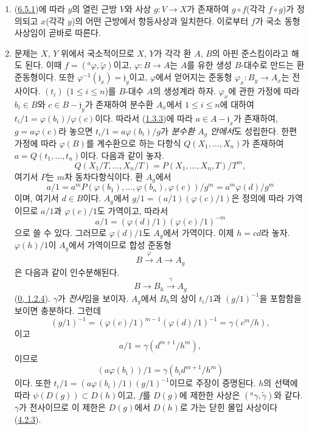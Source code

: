 \begin{enumerate}
  \item[\rm(ii)] (\hyperref[I.6.5.1-ko]{6.5.1})에 따라 $y$의 열린 근방
    $V$와 사상 $g:V\to X$가 존재하여 $g\circ f$(각각 $f\circ g$)가
    정의되고 $x$(각각 $y$)의 어떤 근방에서 항등사상과 일치한다. 이로부터
    $f$가 국소 동형사상임이 곧바로 따른다.
  \item[\rm(i)] 문제는 $X$, $Y$ 위에서 국소적이므로 $X$, $Y$가 각각 환
    $A$, $B$의 아핀 준스킴이라고 해도 된다. 이때
    $f=({}^a\varphi,\widetilde{\varphi})$이고, $\varphi:B\to A$는 $A$를
    유한 생성 $B$-대수로 만드는 환 준동형이다. 또한
    $\varphi^{-1}(\mathfrak{j}_x)=\mathfrak{j}_y$이고, $\varphi$에서
    얻어지는 준동형 $\varphi_x:B_y\to A_x$는 전사이다. $(t_i)$
    ($1\leq i\leq n$)를 $B$-대수 $A$의 생성계라 하자. $\varphi_x$에 관한
    가정에 따라 $b_i\in B$와 $c\in B-\mathfrak{j}_y$가 존재하여 분수환
    $A_x$에서 $1\leq i\leq n$에 대하여
    $t_i/1=\varphi(b_i)/\varphi(c)$이다. 따라서
    (\hyperref[I.1.3.3-ko]{1.3.3})에 따라 $a\in A-\mathfrak{j}_x$가
    존재하여, $g=a\varphi(c)$라 놓으면
    $t_i/1=a\varphi(b_i)/g$가 \emph{분수환 $A_g$ 안에서}도 성립한다.
    한편 가정에 따라 $\varphi(B)$를 계수환으로 하는 다항식
    $Q(X_1,\ldots,X_n)$가
    존재하여 $a=Q(t_1,\ldots,t_n)$이다. 다음과 같이 놓자.
    \[
      Q(X_1/T,\ldots,X_n/T)
      =P(X_1,\ldots,X_n,T)/T^m,
    \]
    여기서 $P$는 $m$차 동차다항식이다. 환 $A_g$에서
    \[
      a/1
      =a^mP(\varphi(b_1),\ldots,\varphi(b_n),\varphi(c))/g^m
      =a^m\varphi(d)/g^m
    \]
    이며, 여기서 $d\in B$이다. $A_g$에서
    $g/1=(a/1)(\varphi(c)/1)$은 정의에 따라 가역이므로 $a/1$과
    $\varphi(c)/1$도 가역이고, 따라서
    \[
      a/1=(\varphi(d)/1)(\varphi(c)/1)^{-m}
    \]
    으로 쓸 수 있다. 그러므로 $\varphi(d)/1$도 $A_g$에서 가역이다.
    이제 $h=cd$라 놓자. $\varphi(h)/1$이 $A_g$에서 가역이므로 합성
    준동형
    \[
      B\xrightarrow{\varphi}A\longrightarrow A_g
    \]
    은 다음과 같이 인수분해된다.
    \[
      B\longrightarrow B_h\xrightarrow{\gamma}A_g
    \]
    (\hyperref[0.1.2.4-ko]{0, 1.2.4}). $\gamma$가
    \emph{전사}임을 보이자. $A_g$에서 $B_h$의 상이 $t_i/1$과
    $(g/1)^{-1}$을 포함함을 보이면 충분하다. 그런데
    \[
      (g/1)^{-1}
      =(\varphi(c)/1)^{m-1}(\varphi(d)/1)^{-1}
      =\gamma(c^m/h),
    \]
    이고
    \[
      a/1=\gamma(d^{m+1}/h^m),
    \]
    이므로
    \[
      (a\varphi(b_i))/1=\gamma(b_i d^{m+1}/h^m)
    \]
    이다. 또한
    $t_i/1=(a\varphi(b_i)/1)(g/1)^{-1}$이므로 주장이 증명된다. $h$의
    선택에 따라 $\psi(D(g))\subset D(h)$이고, $f$를 $D(g)$에 제한한
    사상은 $({}^a\gamma,\widetilde{\gamma})$와 같다. $\gamma$가 전사이므로
    이 제한은 $D(g)$에서 $D(h)$로 가는 닫힌 몰입 사상이다
    (\hyperref[I.4.2.3-ko]{4.2.3}).
\end{enumerate}

